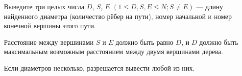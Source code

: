 Выведите три целых числа $D$, $S$, $E$ $(1 \le D, S, E \le N; S \neq E)$ --- длину найденного диаметра (количество рёбер на пути), номер начальной и номер конечной вершины этого пути.

Расстояние между вершинами $S$ и $E$ должно быть равно $D$, и $D$ должно быть максимальным возможным расстоянием между двумя вершинами дерева.

Если диаметров несколько, разрешается вывести любой из них.
